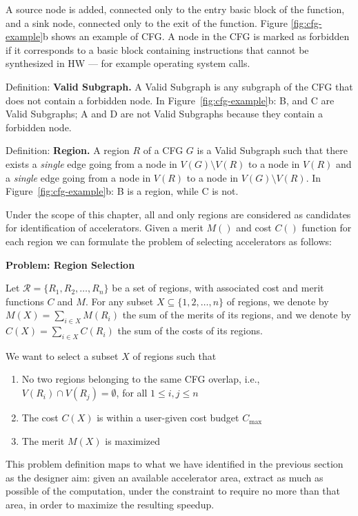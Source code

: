 \documentclass[]{usiinfthesis}
\begin{document}
A source node is added, connected only to the entry basic block of
the function, and a sink node, connected only to the exit of the
function. Figure \ref{fig:cfg-example}b shows an example of CFG. A
node in the CFG is marked as forbidden if it corresponds to a basic
block containing instructions that cannot be synthesized in HW --- for
example operating system calls.\par

Definition: \textbf{Valid Subgraph.}  A Valid Subgraph is any subgraph
of the CFG that does not contain a forbidden node. In
Figure~\ref{fig:cfg-example}b: B, and C are Valid Subgraphs; A and D
are not Valid Subgraphs because they contain a forbidden node.\par

Definition: \textbf{Region.} A region $R$ of a CFG $G$ is a Valid
Subgraph such that there exists a \emph{single} edge going from a node
in $V(G)\setminus V(R)$ to a node in $V(R)$ and a \emph{single} edge
going from a node in $V(R)$ to a node in $V(G)\setminus V(R)$. In
Figure~\ref{fig:cfg-example}b: B is a region, while C is not.\par

Under the scope of this chapter, all and only regions are considered as
candidates for identification of accelerators.
Given a merit $M()$ and cost $C()$ function for each region 
we can formulate the problem of selecting accelerators as follows:

\textbf{Problem: Region Selection}

Let $\mathcal{R} = \{ R_1, R_2, \ldots, R_n \}$ be a set of regions,
with associated cost and merit functions $C$ and $M$.
For any subset $X\subseteq \{1,2,\ldots,n\}$ of regions,
we denote by $M(X) = \sum_{i\in X} M(R_i)$ the sum of the merits of
its regions, and we denote by $C(X) = \sum_{i\in X} C(R_i)$ the sum of
the costs of its regions.

We want to select a subset $X$ of regions such that
\begin{enumerate}
\item No two regions belonging to the same CFG overlap, i.e.,
  $V(R_i)\cap V(R_j) = \emptyset$, for all $1\le i,j\le n$
\item The cost $C(X)$ is within a user-given cost budget $C_{\max}$
\item The merit $M(X)$ is maximized
\end{enumerate}

This problem definition maps to what we have identified in the previous 
section as the designer aim: given an available
accelerator area, extract as much as possible of the computation,
under the constraint to require no more than that area, in order to
maximize the resulting speedup.
\end{document}
